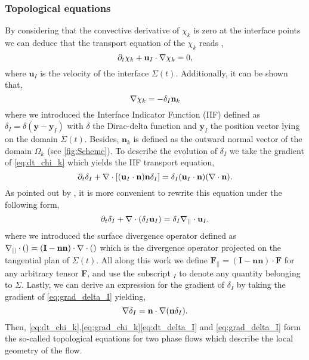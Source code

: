 \subsubsection*{Topological equations}
By considering that the convective derivative of $\chi_k$ is zero at the interface points we can deduce that the transport equation of the $\chi_k$ reads \citep{drew1983mathematical,kataoka1986local,morel2015mathematical},
\begin{equation}
    \partial_t \chi_k
    + \textbf{u}_I \cdot \mathbf{\nabla} \chi_k
    = 0,
    \label{eq:dt_chi_k}
\end{equation}
where $\textbf{u}_I$ is the velocity of the interface $\Sigma(t)$.
Additionally, it can be shown \citep{tryggvason2011direct,drew1983mathematical,kataoka1986local,bothe2022sharp} that,
\begin{equation}
    \mathbf{\nabla} \chi_k
    = - \delta_I \textbf{n}_k
    \label{eq:grad_chi_k}
\end{equation}
where we introduced the Interface Indicator Function (IIF) defined as $\delta_I = \delta(\textbf{y}-\textbf{y}_I)$ with $\delta$ the Dirac-delta function and $\textbf{y}_I$ the position vector lying on the domain $\Sigma(t)$.
Besides, $\textbf{n}_k$ is defined as the outward normal vector of the domain $\Omega_k$ (see \ref{fig:Scheme}).
To describe the evolution of $\delta_I$ we take the gradient of \ref{eq:dt_chi_k} which yields the IIF transport equation,
\begin{equation}
    \partial_t \delta_I
    + \mathbf{\nabla} \cdot \left[(\textbf{u}_I\cdot\textbf{n})\textbf{n} \delta_I\right]
    = \delta_I (\textbf{u}_I\cdot\textbf{n})(\mathbf{\nabla} \cdot\textbf{n}). 
\end{equation}
As pointed out by \citet{morel2007surface}, it is more convenient to rewrite this equation under the following form,
\begin{equation}
    \partial_t \delta_I
    + \mathbf{\nabla} \cdot (\delta_I \textbf{u}_I)
    = \delta_I \mathbf{\nabla}_{||} \cdot \textbf{u}_I.
    \label{eq:dt_delta_I}
\end{equation}
where we introduced the surface divergence operator defined as $\mathbf{\nabla}_{||} \cdot ()= (\textbf{I}-\textbf{nn})\cdot \mathbf{\nabla} \cdot ()$ which is the divergence operator projected on the tangential plan of $\Sigma(t)$. 
All along this work we define $\textbf{F}_{||} = (\textbf{I}-\textbf{nn})\cdot \textbf{F}$ for any arbitrary tensor $\textbf{F}$, and use the subscript $_I$ to denote any quantity belonging to $\Sigma$.   
Lastly, we can derive an expression for the gradient of $\delta_I$ by taking the gradient of \ref{eq:grad_delta_I} yielding,
\begin{equation}
    \mathbf{\nabla}\delta_I 
    = \textbf{n} \cdot \mathbf{\nabla} (\textbf{n} \delta_I).
    \label{eq:grad_delta_I}
\end{equation}
Then, \ref{eq:dt_chi_k},\ref{eq:grad_chi_k}\ref{eq:dt_delta_I} and \ref{eq:grad_delta_I} form the so-called topological equations for two phase flows which describe the local geometry of the flow.

